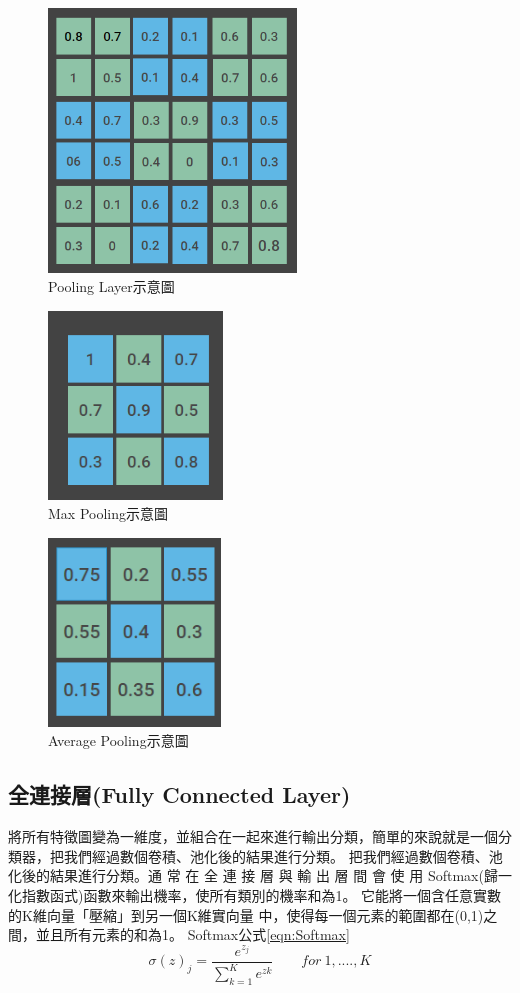\begin{figure}[H]
	\centerline{\includegraphics[height=7cm]{pic/pooling 1.PNG}}

	\caption{Pooling Layer示意圖}
	\label{fig:PoolingLayer}
\end{figure}
\begin{figure}[H]
	\centerline{\includegraphics[height=5cm]{pic/poolinig 2.PNG}}
	\caption{Max Pooling示意圖}
	\label{fig:MaxPooling}
\end{figure}
\begin{figure}[H]
	\centerline{\includegraphics[height=5cm]{pic/pooling 3.PNG}}
	\caption{Average Pooling示意圖}
	\label{fig:AveragePooling}
\end{figure}


\subsection{全連接層(Fully Connected Layer)}
將所有特徵圖變為一維度，並組合在一起來進行輸出分類，簡單的來說就是一個分類器，把我們經過數個卷積、池化後的結果進行分類。
把我們經過數個卷積、池化後的結果進行分類。通 常 在 全 連 接 層 與 輸 出 層 間 會 使 用 Softmax(歸一化指數函式)函數來輸出機率，使所有類別的機率和為1。
它能將一個含任意實數的K維向量「壓縮」到另一個K維實向量 中，使得每一個元素的範圍都在(0,1)之間，並且所有元素的和為1。
Softmax公式\ref{eqn:Softmax}
\begin{equation}
	\label{eqn:Softmax}
	\sigma(z)_j=\frac{e^{z_j}}{\sum_{k=1}^{K}e^{zk}} \ \ \ \ \ \ \ \ \ for\ 1,....,K
\end{equation}


